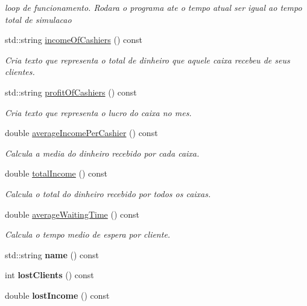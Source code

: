 \begin{DoxyCompactItemize}
\begin{DoxyCompactList}\small\item\em loop de funcionamento. Rodara o programa ate o tempo atual ser igual ao tempo total de simulacao \end{DoxyCompactList}\item 
std\-::string \hyperlink{classSupermarket_a3cb0363d56004ae5f42863d00bb952da}{income\-Of\-Cashiers} () const 
\begin{DoxyCompactList}\small\item\em Cria texto que representa o total de dinheiro que aquele caixa recebeu de seus clientes. \end{DoxyCompactList}\item 
std\-::string \hyperlink{classSupermarket_a2e35d76f55bf6b5669b5101a2d7ebc93}{profit\-Of\-Cashiers} () const 
\begin{DoxyCompactList}\small\item\em Cria texto que representa o lucro do caixa no mes. \end{DoxyCompactList}\item 
double \hyperlink{classSupermarket_ab66a7fa61f23cc679011305fa2b5688f}{average\-Income\-Per\-Cashier} () const 
\begin{DoxyCompactList}\small\item\em Calcula a media do dinheiro recebido por cada caixa. \end{DoxyCompactList}\item 
double \hyperlink{classSupermarket_a300fa556a29dc813bc29647df30d0cc3}{total\-Income} () const 
\begin{DoxyCompactList}\small\item\em Calcula o total do dinheiro recebido por todos os caixas. \end{DoxyCompactList}\item 
double \hyperlink{classSupermarket_aa4ee29cd9ef76a00622dcc9afd409efd}{average\-Waiting\-Time} () const 
\begin{DoxyCompactList}\small\item\em Calcula o tempo medio de espera por cliente. \end{DoxyCompactList}\item 
\hypertarget{classSupermarket_aad1cbadfc661d7097aa8e45b43a6de3c}{std\-::string {\bfseries name} () const }\label{classSupermarket_aad1cbadfc661d7097aa8e45b43a6de3c}

\item 
\hypertarget{classSupermarket_af6a5e90ac46538a43854c562d75e763a}{int {\bfseries lost\-Clients} () const }\label{classSupermarket_af6a5e90ac46538a43854c562d75e763a}

\item 
\hypertarget{classSupermarket_a19d1badd6c3efe2dfa719e02a644051f}{double {\bfseries lost\-Income} () const }\label{classSupermarket_a19d1badd6c3efe2dfa719e02a644051f}

\end{DoxyCompactItemize}


